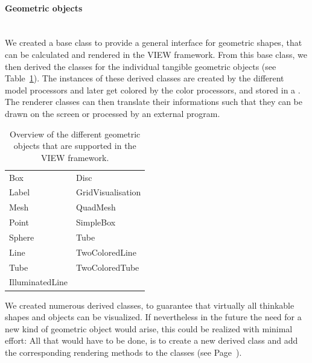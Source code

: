 \paragraph{Geometric objects}
\hspace*{\fill}\\
\label{geometric_objects}
We created a base class  to provide a general interface
for geometric shapes, that can be calculated and rendered in the VIEW
framework. From this base class, we then derived the classes for the individual
tangible geometric objects (see Table~\ref{tab:go}). The instances of these 
derived classes are created by the different model processors and later get 
colored by the color processors, and stored in a . The 
renderer classes can then translate their informations such that they can \eg
be drawn on the screen or processed by an external program.
\begin{table} [ht] %
\centering
\begin{tabular} {|l|l|}
\hline
Box & Disc\\
Label & GridVisualisation\\
Mesh & QuadMesh\\
Point & SimpleBox\\
Sphere & Tube\\
Line & TwoColoredLine \\
Tube & TwoColoredTube\\
IlluminatedLine& \\
\hline
\end{tabular}
\caption{Overview of the different geometric objects that are supported in the VIEW 
	framework.}
\label{tab:go}
\end{table}

We created numerous derived  classes, to guarantee that virtually
all thinkable shapes and objects can be visualized. 
If nevertheless in the future the need for a new kind of geometric object would arise, 
this could be realized with minimal effort:
All that would have to be done, is to create a new derived  class and 
add the corresponding rendering methods to the  classes 
(see Page~\pageref{renderer}).

\label{representation}
